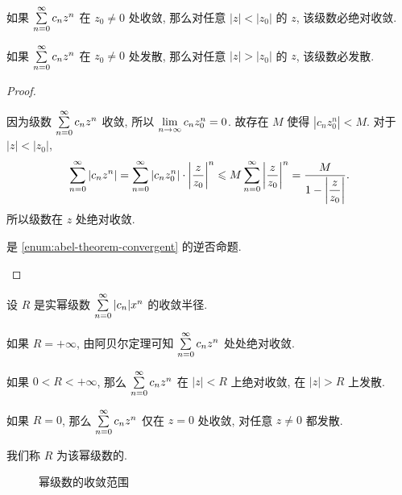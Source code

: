 \begin{theorem}[阿贝尔定理]
	\begin{enumpar}
		\item 如果 $\sum\limits_{n=0}^\infty c_nz^n$ 在 $z_0\neq 0$ 处收敛, 那么对任意 $|z|<|z_0|$ 的 $z$, 该级数必绝对收敛.\label{enum:abel-theorem-convergent}
		\item 如果 $\sum\limits_{n=0}^\infty c_nz^n$ 在 $z_0\neq 0$ 处发散, 那么对任意 $|z|>|z_0|$ 的 $z$, 该级数必发散.
	\end{enumpar}
\end{theorem}

\begin{proof}\delspace
	\begin{enumnopar}
		\item 因为级数 $\sum\limits_{n=0}^\infty c_nz^n$ 收敛, 所以 $\lim\limits_{n\to\infty}c_n z_0^n=0$.
			故存在 $M$ 使得 $|c_nz_0^n|<M$.
			对于 $|z|<|z_0|$,
			\[
				\sum_{n=0}^\infty|c_nz^n|=\sum_{n=0}^\infty|c_nz_0^n|\cdot\left|\frac z{z_0}\right|^n
				\leqslant M\sum_{n=0}^\infty\left|\frac z{z_0}\right|^n
				=\frac{M}{1-\left|\dfrac z{z_0}\right|}.
			\]
			所以级数在 $z$ 处绝对收敛.
		\item 是 \ref{enum:abel-theorem-convergent} 的逆否命题.\qedhere
	\end{enumnopar}
\end{proof}

设 $R$ 是实幂级数 $\sum\limits_{n=0}^\infty|c_n|x^n$ 的收敛半径.
\begin{itempar}
	\item 如果 $R=+\infty$, 由阿贝尔定理可知 $\sum\limits_{n=0}^\infty c_nz^n$ 处处绝对收敛.
	\item 如果 $0<R<+\infty$, 那么 $\sum\limits_{n=0}^\infty c_nz^n$ 在 $|z|<R$ 上绝对收敛, 在 $|z|>R$ 上发散.
	\item 如果 $R=0$, 那么 $\sum\limits_{n=0}^\infty c_nz^n$ 仅在 $z=0$ 处收敛, 对任意 $z\neq 0$ 都发散.
\end{itempar}\par\noindent
我们称 $R$ 为该幂级数的.

\begin{figure}[!hbt]
	\centering
	\caption{幂级数的收敛范围}
\end{figure}

